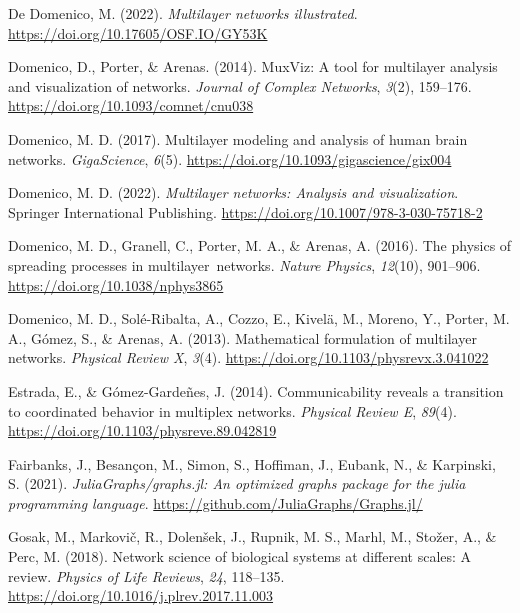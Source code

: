 \documentclass[
]{article}
\newlength{\cslhangindent}
\newlength{\cslentryspacingunit} %
\newenvironment{CSLReferences}[2] %
 {%
  \setlength{\parindent}{0pt}
  \ifodd #1
  \let\oldpar\par
  \def\par{\hangindent=\cslhangindent\oldpar}
  \fi
  \setlength{\parskip}{#2\cslentryspacingunit}
 }%
 {}
\begin{document}
\begin{CSLReferences}{1}{0}
\leavevmode{}%
De Domenico, M. (2022). \emph{Multilayer networks illustrated}.
\url{https://doi.org/10.17605/OSF.IO/GY53K}

\leavevmode{}%
Domenico, D., Porter, \& Arenas. (2014). {MuxViz}: A tool for multilayer
analysis and visualization of networks. \emph{Journal of Complex
Networks}, \emph{3}(2), 159--176.
\url{https://doi.org/10.1093/comnet/cnu038}

\leavevmode{}%
Domenico, M. D. (2017). Multilayer modeling and analysis of human brain
networks. \emph{{GigaScience}}, \emph{6}(5).
\url{https://doi.org/10.1093/gigascience/gix004}

\leavevmode{}%
Domenico, M. D. (2022). \emph{Multilayer networks: Analysis and
visualization}. Springer International Publishing.
\url{https://doi.org/10.1007/978-3-030-75718-2}

\leavevmode{}%
Domenico, M. D., Granell, C., Porter, M. A., \& Arenas, A. (2016). The
physics of spreading processes in multilayer~networks. \emph{Nature
Physics}, \emph{12}(10), 901--906.
\url{https://doi.org/10.1038/nphys3865}

\leavevmode{}%
Domenico, M. D., Solé-Ribalta, A., Cozzo, E., Kivelä, M., Moreno, Y.,
Porter, M. A., Gómez, S., \& Arenas, A. (2013). Mathematical formulation
of multilayer networks. \emph{Physical Review X}, \emph{3}(4).
\url{https://doi.org/10.1103/physrevx.3.041022}

\leavevmode{}%
Estrada, E., \& Gómez-Gardeñes, J. (2014). Communicability reveals a
transition to coordinated behavior in multiplex networks. \emph{Physical
Review E}, \emph{89}(4).
\url{https://doi.org/10.1103/physreve.89.042819}

\leavevmode{}%
Fairbanks, J., Besançon, M., Simon, S., Hoffiman, J., Eubank, N., \&
Karpinski, S. (2021). \emph{JuliaGraphs/graphs.jl: An optimized graphs
package for the julia programming language}.
\url{https://github.com/JuliaGraphs/Graphs.jl/}

\leavevmode{}%
Gosak, M., Markovič, R., Dolenšek, J., Rupnik, M. S., Marhl, M., Stožer,
A., \& Perc, M. (2018). Network science of biological systems at
different scales: A review. \emph{Physics of Life Reviews}, \emph{24},
118--135. \url{https://doi.org/10.1016/j.plrev.2017.11.003}


\end{CSLReferences}
\end{document}
